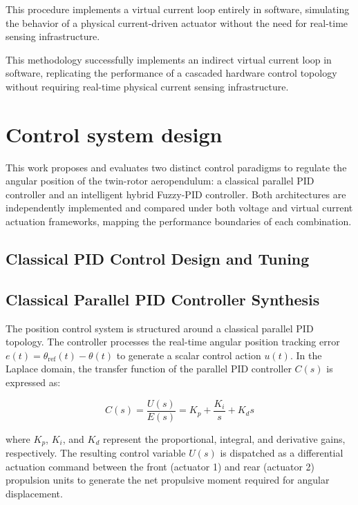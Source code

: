 \documentclass[pdflatex,sn-mathphys-num,iicol]{sn-jnl}
\theoremstyle{thmstyleone}%
\theoremstyle{thmstyletwo}%
\theoremstyle{thmstylethree}%
\begin{document}
This procedure implements a virtual current loop entirely in software, simulating the behavior of a physical current-driven actuator without the need for real-time sensing infrastructure.

This methodology successfully implements an indirect virtual current loop in software, replicating the performance of a cascaded hardware control topology without requiring real-time physical current sensing infrastructure.



\section{Control system design}\label{sec5}

This work proposes and evaluates two distinct control paradigms to regulate the angular position of the twin-rotor aeropendulum: a classical parallel PID controller and an intelligent hybrid Fuzzy-PID controller. Both architectures are independently implemented and compared under both voltage and virtual current actuation frameworks, mapping the performance boundaries of each combination.

\subsection{Classical PID Control Design and Tuning}
\label{sub:pid_design}


\subsection{Classical Parallel PID Controller Synthesis}
\label{sub:pid_synthesis}

The position control system is structured around a classical parallel PID topology. The controller processes the real-time angular position tracking error $e(t) = \theta_{\text{ref}}(t) - \theta(t)$ to generate a scalar control action $u(t)$. In the Laplace domain, the transfer function of the parallel PID controller $C(s)$ is expressed as:

\begin{equation}
C(s) = \frac{U(s)}{E(s)} = K_p + \frac{K_i}{s} + K_d s
\label{eq:pid_transfer_function}
\end{equation}

where $K_p$, $K_i$, and $K_d$ represent the proportional, integral, and derivative gains, respectively. The resulting control variable $U(s)$ is dispatched as a differential actuation command between the front (actuator 1) and rear (actuator 2) propulsion units to generate the net propulsive moment required for angular displacement.
\end{document}
